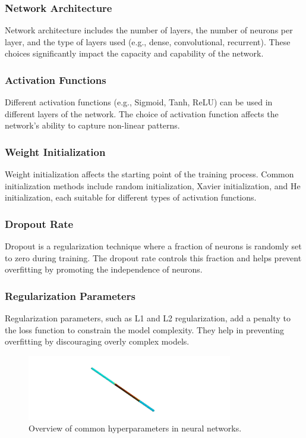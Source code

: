         \subsubsection{Network Architecture}

            Network architecture includes the number of layers, the number of neurons per layer, and the type of layers used (e.g., dense, convolutional, recurrent). These choices significantly impact the capacity and capability of the network.

        \subsubsection{Activation Functions}

            Different activation functions (e.g., Sigmoid, Tanh, ReLU) can be used in different layers of the network. The choice of activation function affects the network's ability to capture non-linear patterns.

        \subsubsection{Weight Initialization}

            Weight initialization affects the starting point of the training process. Common initialization methods include random initialization, Xavier initialization, and He initialization, each suitable for different types of activation functions.

        \subsubsection{Dropout Rate}

            Dropout is a regularization technique where a fraction of neurons is randomly set to zero during training. The dropout rate controls this fraction and helps prevent overfitting by promoting the independence of neurons.

        \subsubsection{Regularization Parameters}

            Regularization parameters, such as L1 and L2 regularization, add a penalty to the loss function to constrain the model complexity. They help in preventing overfitting by discouraging overly complex models.

    \begin{figure}[h]
        \centering
        \includegraphics[width=0.8\textwidth]{00_Images/00_Velocity.png}
        \caption{Overview of common hyperparameters in neural networks.}
        \label{fig:hyperparameters}
    \end{figure}

